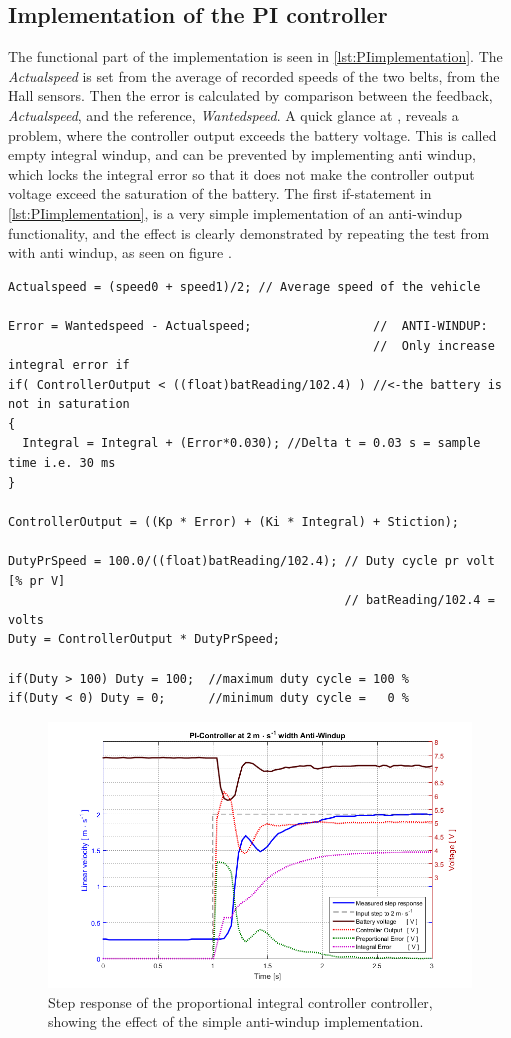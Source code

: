 \subsection{Implementation of the PI controller}
The functional part of the implementation is seen in \autoref{lst:PIimplementation}. The \emph{Actualspeed} is set from the average of recorded speeds of the two belts, from the Hall sensors. Then the error is calculated by comparison between the feedback, \emph{Actualspeed}, and the reference, \emph{Wantedspeed}.
A quick glance at , reveals a problem, where the controller output exceeds the battery voltage. This is called empty integral windup, and can be prevented by implementing anti windup, which locks the integral error so that it does not make the controller output voltage exceed the saturation of the battery. The first if-statement in \autoref{lst:PIimplementation}, is a very simple implementation of an anti-windup functionality, and the effect is clearly demonstrated by repeating the test from  with anti windup, as seen on figure .
%
\begin{lstlisting}
Actualspeed = (speed0 + speed1)/2; // Average speed of the vehicle

Error = Wantedspeed - Actualspeed;                 //  ANTI-WINDUP:
                                                   //  Only increase integral error if
if( ControllerOutput < ((float)batReading/102.4) ) //<-the battery is not in saturation
{
  Integral = Integral + (Error*0.030); //Delta t = 0.03 s = sample time i.e. 30 ms
}

ControllerOutput = ((Kp * Error) + (Ki * Integral) + Stiction);

DutyPrSpeed = 100.0/((float)batReading/102.4); // Duty cycle pr volt [% pr V]
                                               // batReading/102.4 = volts
Duty = ControllerOutput * DutyPrSpeed;

if(Duty > 100) Duty = 100;  //maximum duty cycle = 100 %
if(Duty < 0) Duty = 0;      //minimum duty cycle =   0 %
\end{lstlisting}
%
\begin{figure}[H]
 	\centering
 	\includegraphics[width=.9\textwidth]{figures/PIwidthAntiWindup}
 	\caption{Step response of the proportional integral controller controller, showing the effect of the simple anti-windup implementation.}
 	\label{fig:PIwithAntiWindup}
\end{figure}
